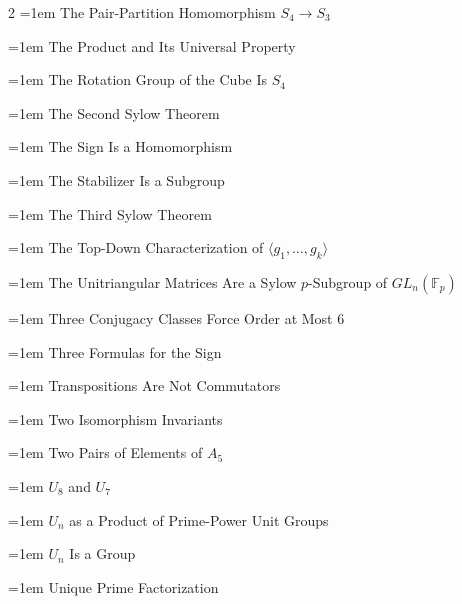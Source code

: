 \documentclass[11pt]{report}
\begin{document}
\begin{multicols}{2}
\noindent\hangindent=1em The Pair-Partition Homomorphism $S_4 \to S_3$\dotfill \pageref{prop:pair-partition-homomorphism-s4-to-s3}\par
\noindent\hangindent=1em The Product and Its Universal Property\dotfill \pageref{prop:product-universal-property}\par
\noindent\hangindent=1em The Rotation Group of the Cube Is $S_4$\dotfill \pageref{thm:rotation-group-cube-s4}\par
\noindent\hangindent=1em The Second Sylow Theorem\dotfill \pageref{thm:sylow-second}\par
\noindent\hangindent=1em The Sign Is a Homomorphism\dotfill \pageref{thm:sign-homomorphism}\par
\noindent\hangindent=1em The Stabilizer Is a Subgroup\dotfill \pageref{prop:stabilizer-subgroup}\par
\noindent\hangindent=1em The Third Sylow Theorem\dotfill \pageref{thm:sylow-third}\par
\noindent\hangindent=1em The Top-Down Characterization of $\langle g_1, \ldots, g_k \rangle$\dotfill \pageref{prop:top-down-characterization-gen-g1-gk}\par
\noindent\hangindent=1em The Unitriangular Matrices Are a Sylow $p$-Subgroup of $GL_n(\mathbb{F}_p)$\dotfill \pageref{prop:unitriangular-sylow}\par
\noindent\hangindent=1em Three Conjugacy Classes Force Order at Most $6$\dotfill \pageref{prop:three-conjugacy-classes-force-order-at-most-6}\par
\noindent\hangindent=1em Three Formulas for the Sign\dotfill \pageref{thm:three-formulas-sign}\par
\noindent\hangindent=1em Transpositions Are Not Commutators\dotfill \pageref{prop:transpositions-not-commutators}\par
\noindent\hangindent=1em Two Isomorphism Invariants\dotfill \pageref{prop:two-isomorphism-invariants}\par
\noindent\hangindent=1em Two Pairs of Elements of $A_5$\dotfill \pageref{prop:two-pairs-a5}\par
\noindent\hangindent=1em $U_8$ and $U_7$\dotfill \pageref{prop:u8-u7}\par
\noindent\hangindent=1em $U_n$ as a Product of Prime-Power Unit Groups\dotfill \pageref{thm:un-product-prime-power-unit-groups}\par
\noindent\hangindent=1em $U_n$ Is a Group\dotfill \pageref{prop:un-group}\par
\noindent\hangindent=1em Unique Prime Factorization\dotfill \pageref{thm:unique-prime-factorization}\par

\end{multicols}
\end{document}

